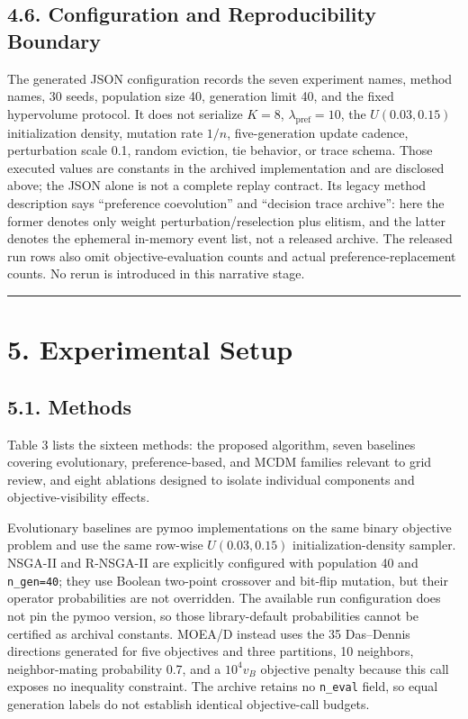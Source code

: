 \documentclass[
  10pt,
  a4paper,
]{article}
\begin{document}
\subsection{4.6. Configuration and Reproducibility
Boundary}\label{configuration-and-reproducibility-boundary}

The generated JSON configuration records the seven experiment names,
method names, 30 seeds, population size 40, generation limit 40, and the
fixed hypervolume protocol. It does not serialize \(K=8\),
\(\lambda_{\mathrm{pref}}=10\), the \(U(0.03,0.15)\) initialization
density, mutation rate \(1/n\), five-generation update cadence,
perturbation scale 0.1, random eviction, tie behavior, or trace schema.
Those executed values are constants in the archived implementation and
are disclosed above; the JSON alone is not a complete replay contract.
Its legacy method description says ``preference coevolution'' and
``decision trace archive'': here the former denotes only weight
perturbation/reselection plus elitism, and the latter denotes the
ephemeral in-memory event list, not a released archive. The released run
rows also omit objective-evaluation counts and actual
preference-replacement counts. No rerun is introduced in this narrative
stage.

\begin{center}\rule{0.5\linewidth}{0.5pt}\end{center}

\section{5. Experimental Setup}\label{experimental-setup}

\subsection{5.1. Methods}\label{methods}

Table 3 lists the sixteen methods: the proposed algorithm, seven
baselines covering evolutionary, preference-based, and MCDM families
relevant to grid review, and eight ablations designed to isolate
individual components and objective-visibility effects.

Evolutionary baselines are pymoo implementations on the same binary
objective problem and use the same row-wise \(U(0.03,0.15)\)
initialization-density sampler. NSGA-II and R-NSGA-II are explicitly
configured with population 40 and \texttt{n\_gen=40}; they use Boolean
two-point crossover and bit-flip mutation, but their operator
probabilities are not overridden. The available run configuration does
not pin the pymoo version, so those library-default probabilities cannot
be certified as archival constants. MOEA/D instead uses the 35
Das--Dennis directions generated for five objectives and three
partitions, 10 neighbors, neighbor-mating probability 0.7, and a
\(10^4v_B\) objective penalty because this call exposes no inequality
constraint. The archive retains no \texttt{n\_eval} field, so equal
generation labels do not establish identical objective-call budgets.
\end{document}
